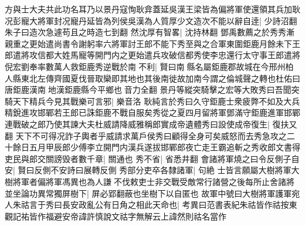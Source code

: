 方與士大夫共此功名耳乃以景丹寇恂耿弇蓋延吳漢王梁皆為偏將軍使還領其兵加耿况彭寵大將軍封况寵丹延皆為列侯吳漢為人質厚少文造次不能以辭自逹|{
	少詩沼翻朱子曰造次急遽苟且之時造七到翻}
然沈厚有智畧|{
	沈持林翻}
鄧禹數薦之於秀秀漸親重之更始遣尚書令謝躬率六將軍討王郎不能下秀至與之合軍東圍鉅鹿月餘未下王郎遣將攻信都大姓馬寵等開門内之更始遣兵攻破信都秀使李忠還行太守事王郎遣將倪宏劉奉率數萬人救鉅鹿秀逆戰於南不利|{
	賢曰南縣名屬鉅鹿郡故城在今邢州柏人縣東北左傳齊國夏伐晉取欒即其地也其後南徙故加南今謂之倫城聲之轉也杜佑曰唐鉅鹿漢南地漢鉅鹿縣今平鄉也音力全翻}
景丹等縱突騎擊之宏等大敗秀曰吾聞突騎天下精兵今見其戰樂可言邪|{
	樂音洛}
耿純言於秀曰久守鉅鹿士衆疲弊不如及大兵精銳進攻邯鄲若王郎已誅鉅鹿不戰自服矣秀從之夏四月留將軍鄧滿守鉅鹿進軍邯鄲連戰破之郎乃使其諫大夫杜威請降威雅稱郎實成帝遺體秀曰設使成帝復生|{
	復扶又翻}
天下不可得况詐子輿者乎威請求萬戶侯秀曰顧得全身可矣威怒而去秀急攻之二十餘日五月甲辰郎少傅李立開門内漢兵遂拔邯鄲郎夜亡走王霸追斬之秀收郎文書得吏民與郎交關謗毁者數千章|{
	關通也}
秀不省|{
	省悉井翻}
會諸將軍燒之曰令反側子自安|{
	賢曰反側不安詩曰展轉反側}
秀部分吏卒各隸諸軍|{
	句絶}
士皆言願屬大樹將軍大樹將軍者偏將軍馮異也為人謙不伐敕吏士非交戰受敵常行諸營之後每所止舍諸將並坐論功異常獨屏樹下|{
	屏必郢翻蔽也坐樹下以自匿也}
故軍中號曰大樹將軍護軍宛人朱祜言于秀曰長安政亂公有日角之相此天命也|{
	考異曰范書表紀朱祜皆作祜按東觀記祐皆作福避安帝諱許慎說文祜字無解云上諱然則祜名當作}


